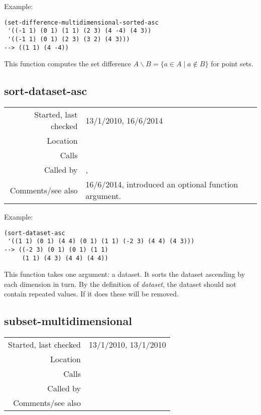 \vspace{0.5cm}
\noindent Example:
\begin{verbatim}
(set-difference-multidimensional-sorted-asc
 '((-1 1) (0 1) (1 1) (2 3) (4 -4) (4 3))
 '((-1 1) (0 1) (2 3) (3 2) (4 3)))
--> ((1 1) (4 -4))
\end{verbatim}

\noindent This function computes the set difference
$A\backslash B = \{ a \in A \mid a \notin B \}$ for
point sets.


\subsection*{sort-dataset-asc}\label{fun:sort-dataset-asc}

\vspace{0.3cm}
\begin{tabular}{r|p{8cm}}
Started, last checked & 13/1/2010, 16/6/2014 \\
Location & \nameref{sec:set-operations} \\
Calls & \\
Called by & \nameref{fun:union-multidimensional-sorted-asc},\newline \nameref{fun:unions-multidimensional-sorted-asc} \\
Comments/see also & 16/6/2014, introduced an optional function argument.
\end{tabular}

\vspace{0.5cm}
\noindent Example:
\begin{verbatim}
(sort-dataset-asc
 '((1 1) (0 1) (4 4) (0 1) (1 1) (-2 3) (4 4) (4 3)))
--> ((-2 3) (0 1) (0 1) (1 1)
     (1 1) (4 3) (4 4) (4 4))
\end{verbatim}

\noindent This function takes one argument: a dataset.
It sorts the dataset ascending by each dimension in
turn. By the definition of \emph{dataset}, the dataset
should not contain repeated values. If it does these
will be removed.


\subsection*{subset-multidimensional}\label{fun:subset-multidimensional}

\vspace{0.3cm}
\begin{tabular}{r|p{8cm}}
Started, last checked & 13/1/2010, 13/1/2010 \\
Location & \nameref{sec:set-operations} \\
Calls & \nameref{fun:test-equal<list-elements} \\
Called by & \nameref{fun:subset-score-of-pattern} \\
Comments/see also &
\end{tabular}

